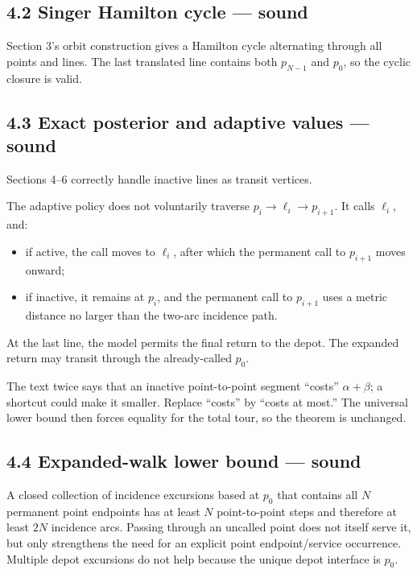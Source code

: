 \documentclass[11pt,a4paper]{article}
\begin{document}
\subsection*{4.2 Singer Hamilton cycle — sound}

Section 3's orbit construction gives a Hamilton cycle alternating through all points and lines.  The last translated line contains both \(p_{N-1}\) and \(p_0\), so the cyclic closure is valid.


\subsection*{4.3 Exact posterior and adaptive values — sound}

Sections 4–6 correctly handle inactive lines as transit vertices.


The adaptive policy does not voluntarily traverse \(p_i\to\ell_i\to p_{i+1}\).  It calls \(\ell_i\), and:


\begin{itemize}

\item if active, the call moves to \(\ell_i\), after which the permanent call to \(p_{i+1}\) moves onward;

\item if inactive, it remains at \(p_i\), and the permanent call to \(p_{i+1}\) uses a metric distance no larger than the two-arc incidence path.

\end{itemize}

At the last line, the model permits the final return to the depot.  The expanded return may transit through the already-called \(p_0\).


The text twice says that an inactive point-to-point segment “costs” \(\alpha+\beta\); a shortcut could make it smaller.  Replace “costs” by “costs at most.”  The universal lower bound then forces equality for the total tour, so the theorem is unchanged.


\subsection*{4.4 Expanded-walk lower bound — sound}

A closed collection of incidence excursions based at \(p_0\) that contains all \(N\) permanent point endpoints has at least \(N\) point-to-point steps and therefore at least \(2N\) incidence arcs.  Passing through an uncalled point does not itself serve it, but only strengthens the need for an explicit point endpoint/service occurrence.  Multiple depot excursions do not help because the unique depot interface is \(p_0\).
\end{document}
